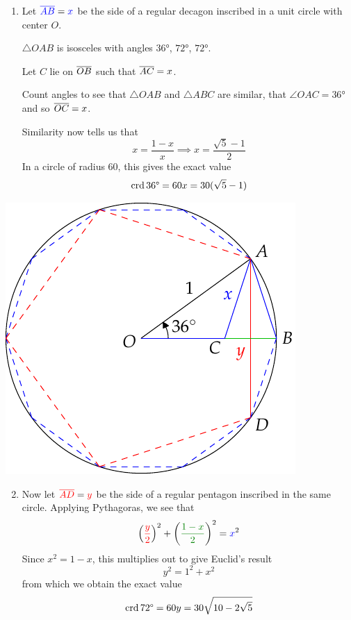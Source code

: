 \begin{minipage}[t]{0.55\linewidth}\vspace{0pt}
\begin{enumerate}
  \item Let $\textcolor{blue}{\cl{AB}}=\textcolor{blue}{x}$ be the side of a regular decagon inscribed in a unit circle with center $O$.\par
  $\triangle OAB$ is isosceles with angles $\ang{36}$, $\ang{72}$, $\ang{72}$.\par
	Let $C$ lie on $\cl{OB}$ such that $\cl{AC}=x$.\par
	Count angles to see that $\triangle OAB$ and $\triangle ABC$ are similar, that $\angle OAC=\ang{36}$ and so $\cl{OC}=x$.\par
	Similarity now tells us that
	\[x=\frac{1-x}x\implies x=\dfrac{\sqrt 5-1}2\]
	In a circle of radius 60, this gives the exact value
  \[\crd \ang{36}=60x=30(\sqrt 5-1)\]
  \end{enumerate}
\end{minipage}\hfill\begin{minipage}[t]{0.44\linewidth}\vspace{0pt}
\flushright\includegraphics[scale=0.95]{pentagon}
\end{minipage}

\begin{enumerate}\setcounter{enumi}{1}
  \item Now let $\textcolor{red}{\cl{AD}}=\textcolor{red}{y}$ be the side of a regular pentagon inscribed in the same circle. Applying Pythagoras, we see that
  \[\left(\textcolor{red}{\frac y2}\right)^2+\left(\textcolor{Green}{\frac{1-x}2}\right)^2=\textcolor{blue}{x}^2\]
  Since $x^2=1-x$, this multiplies out to give Euclid's result
  \[y^2=1^2+x^2\]
  from which we obtain the exact value
  \[\crd\ang{72}=60y=30\sqrt{10-2\sqrt 5}\]
\end{enumerate}
  
